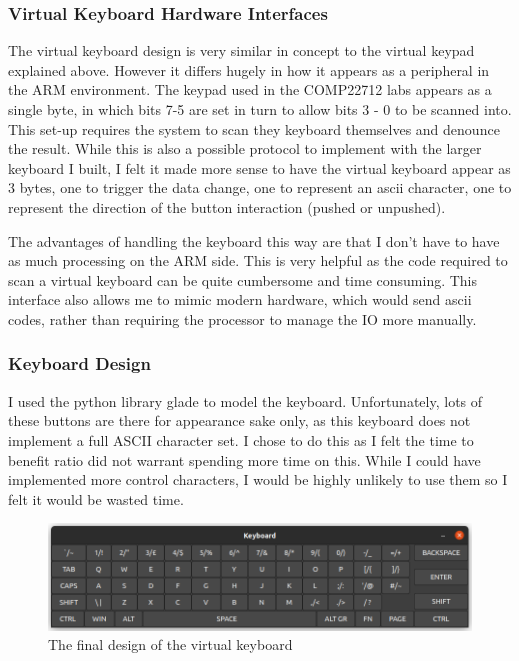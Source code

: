 \subsubsection{Virtual Keyboard Hardware Interfaces}
The virtual keyboard design is very similar in concept to the virtual keypad explained above. However it differs hugely in how it appears as a peripheral in the ARM environment. The keypad used in the COMP22712 labs appears as a single byte, in which bits 7-5 are set in turn to allow bits 3 - 0 to be scanned into. This set-up requires the system to scan they keyboard themselves and denounce the result. While this is also a possible protocol to implement with the larger keyboard I built, I felt it made more sense to have the virtual keyboard appear as 3 bytes, one to trigger the data change, one to represent an ascii character, one to represent the direction of the button interaction (pushed or unpushed).

The advantages of handling the keyboard this way are that I don't have to have as much processing on the ARM side. This is very helpful as the code required to scan a virtual keyboard can be quite cumbersome and time consuming. This interface also allows me to mimic modern hardware, which would send ascii codes, rather than requiring the processor to manage the IO more manually. 
\subsubsection{Keyboard Design}
I used the python library glade to model the keyboard. Unfortunately, lots of these buttons are there for appearance sake only, as this keyboard does not implement a full ASCII character set. I chose to do this as I felt the time to benefit ratio did not warrant spending more time on this. While I could have implemented more control characters, I would be highly unlikely to use them so I felt it would be wasted time. 

\begin{figure}[ht!]
	\includegraphics[width=\linewidth]{figures/keyboard.png}
	\caption{The final design of the virtual keyboard}
	\label{fig:keyboard}
\end{figure} 
 
